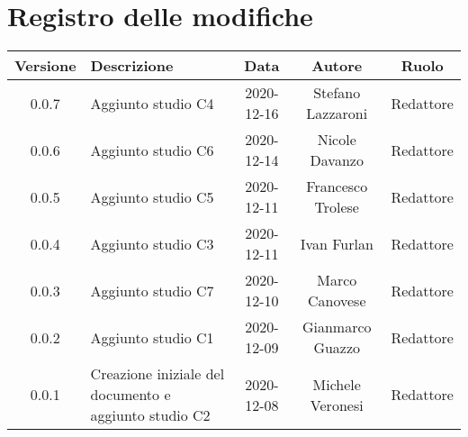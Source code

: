 \section*{Registro delle modifiche}

\begin{center}
	\begin{longtable}{|c|p{5cm}|c|c|c|}
	\hline
	\rowcolor{lighter-grayer}
	\textbf{Versione} & \textbf{Descrizione} & \textbf{Data} & \textbf{Autore} & \textbf{Ruolo} \\
	\hline
	\endfirsthead


	\hline
	0.0.7 & Aggiunto studio C4 & 2020-12-16 & Stefano Lazzaroni & Redattore \\
	0.0.6 & Aggiunto studio C6 & 2020-12-14 & Nicole Davanzo & Redattore \\
	0.0.5 & Aggiunto studio C5 & 2020-12-11 & Francesco Trolese & Redattore \\
	0.0.4 & Aggiunto studio C3 & 2020-12-11 & Ivan Furlan & Redattore \\
	0.0.3 & Aggiunto studio C7 & 2020-12-10 & Marco Canovese & Redattore \\
	0.0.2 & Aggiunto studio C1 & 2020-12-09 & Gianmarco Guazzo & Redattore\\
    0.0.1 & Creazione iniziale del documento e aggiunto studio C2 & 2020-12-08 & Michele Veronesi & Redattore\\
	\hline

	\end{longtable}
\end{center}